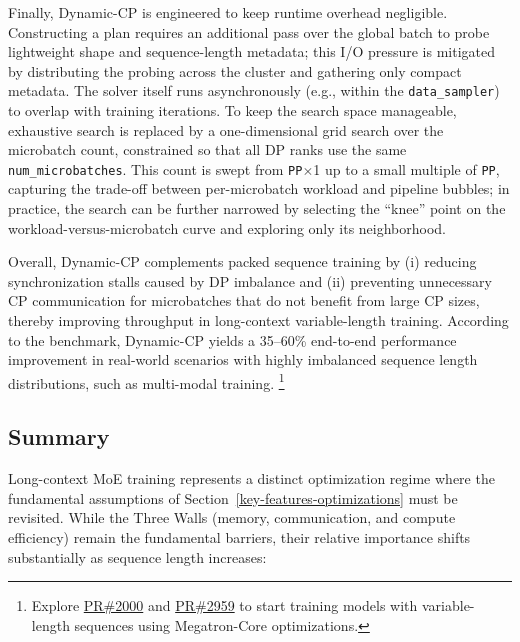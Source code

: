 \documentclass[10pt,logo,copyright]{nvidiatechreport}
\begin{document}
Finally, Dynamic-CP is engineered to keep runtime overhead negligible. Constructing a plan requires an additional pass over the global batch to probe lightweight shape and sequence-length metadata; this I/O pressure is mitigated by distributing the probing across the cluster and gathering only compact metadata. The solver itself runs asynchronously (e.g., within the \texttt{data\_sampler}) to overlap with training iterations. To keep the search space manageable, exhaustive search is replaced by a one-dimensional grid search over the microbatch count, constrained so that all DP ranks use the same \texttt{num\_microbatches}. This count is swept from \texttt{PP}$\times$1 up to a small multiple of \texttt{PP}, capturing the trade-off between per-microbatch workload and pipeline bubbles; in practice, the search can be further narrowed by selecting the ``knee'' point on the workload-versus-microbatch curve and exploring only its neighborhood.


Overall, Dynamic-CP complements packed sequence training by (i) reducing synchronization stalls caused by DP imbalance and (ii) preventing unnecessary CP communication for microbatches that do not benefit from large CP sizes, thereby improving throughput in long-context variable-length training. According to the benchmark, Dynamic-CP yields a 35--60\% end-to-end performance improvement in real-world scenarios with highly imbalanced sequence length distributions, such as multi-modal training. \footnote{Explore \href{https://github.com/NVIDIA/Megatron-LM/pull/2000}{PR\#2000} and \href{https://github.com/NVIDIA/Megatron-LM/pull/2959}{PR\#2959} to start training models with variable-length sequences using Megatron-Core optimizations.}

\subsection{Summary}

Long-context MoE training represents a distinct optimization regime where the fundamental assumptions of Section~\ref{key-features-optimizations} must be revisited. While the Three Walls (memory, communication, and compute efficiency) remain the fundamental barriers, their relative importance shifts substantially as sequence length increases:
\end{document}
